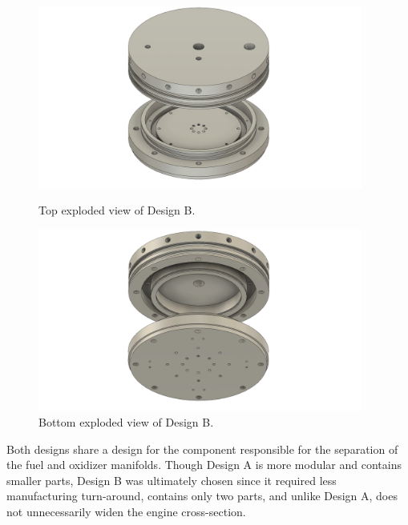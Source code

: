 \documentclass[9pt]{article} %
\numberwithin{equation}{section} %
\begin{document}
\begin{figure}[H]
    \centering
    \begin{minipage}{0.495\textwidth}
        \centering
        \includegraphics[scale=0.5, width=0.95\textwidth, trim={4cm 1cm 4cm 0cm}, clip]{cad_files/Final Injector Assembly EXPLODE1.png} %
        \caption{Top exploded view of Design B.}
        \label{fig:design_b_explode_1}
    \end{minipage}\hfill
    \begin{minipage}{0.495\textwidth}
        \centering
        \includegraphics[scale=0.5, width=0.95\textwidth, trim={4cm 1cm 4cm 0cm}, clip]{cad_files/Final Injector Assembly EXPLODE2.png} %
        \caption{Bottom exploded view of Design B.}
        \label{fig:design_b_explode_2}
    \end{minipage}
\end{figure} 

Both designs share a design for the component responsible for the separation of the fuel and oxidizer manifolds. Though Design A is more modular and contains smaller parts, Design B was ultimately chosen since it required less manufacturing turn-around, contains only two parts, and unlike Design A, does not unnecessarily widen the engine cross-section.
\end{document}
